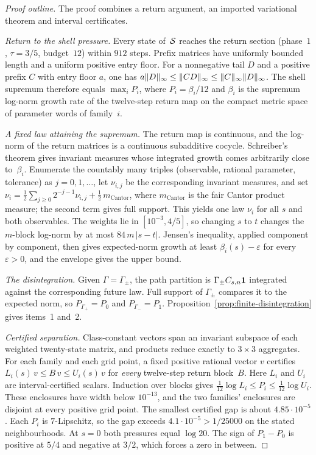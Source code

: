 \begin{proof}[Proof outline]
The proof combines a return argument, an imported variational theorem and interval certificates.

\emph{Return to the shell pressure.} Every state of~$\mathcal{S}$ reaches the return section (phase~$1$, $\tau=3/5$, budget~$12$) within $912$ steps. Prefix matrices have uniformly bounded length and a uniform positive entry floor. For a nonnegative tail $D$ and a positive prefix $C$ with entry floor $a$, one has $a\lVert D\rVert_{\infty}\le\lVert CD\rVert_{\infty}\le\lVert C\rVert_{\infty}\lVert D\rVert_{\infty}$. The shell supremum therefore equals $\max_i P_i$, where $P_i=\beta_i/12$ and $\beta_i$ is the supremum log-norm growth rate of the twelve-step return map on the compact metric space of parameter words of family~$i$.

\emph{A fixed law attaining the supremum.} The return map is continuous, and the log-norm of the return matrices is a continuous subadditive cocycle. Schreiber's theorem \cite[Theorem~1]{Schreiber1998Subadditive} gives invariant measures whose integrated growth comes arbitrarily close to~$\beta_i$. Enumerate the countably many triples (observable, rational parameter, tolerance) as $j=0,1,\dots$, let $\nu_{i,j}$ be the corresponding invariant measures, and set $\nu_i=\tfrac12\sum_{j\ge0}2^{-j-1}\nu_{i,j}+\tfrac12\,m_{\mathrm{Cantor}}$, where $m_{\mathrm{Cantor}}$ is the fair Cantor product measure; the second term gives full support. This yields one law $\nu_i$ for all $s$ and both observables. The weights lie in $[10^{-3},4/5]$, so changing $s$ to $t$ changes the $m$-block log-norm by at most $84\,m\,|s-t|$. Jensen's inequality, applied component by component, then gives expected-norm growth at least $\beta_i(s)-\varepsilon$ for every $\varepsilon>0$, and the envelope gives the upper bound.

\emph{The disintegration.} Given $\Gamma=\Gamma_\pm$, the path partition is $\Gamma_\pm C_{s,n}\mathbf{1}$ integrated against the corresponding future law. Full support of $\Gamma_\pm$ compares it to the expected norm, so $P_{\Gamma_+}=P_0$ and $P_{\Gamma_-}=P_1$. Proposition~\ref{prop:finite-disintegration} gives items~1 and~2.

\emph{Certified separation.} Class-constant vectors span an invariant subspace of each weighted twenty-state matrix, and products reduce exactly to $3\times3$ aggregates. For each family and each grid point, a fixed positive rational vector $v$ certifies $L_i(s)\,v\le B\,v\le U_i(s)\,v$ for \emph{every} twelve-step return block~$B$. Here $L_i$ and $U_i$ are interval-certified scalars. Induction over blocks gives $\frac1{12}\log L_i\le P_i\le\frac1{12}\log U_i$. These enclosures have width below $10^{-13}$, and the two families' enclosures are disjoint at every positive grid point. The smallest certified gap is about $4.85\cdot10^{-5}$. Each $P_i$ is $7$-Lipschitz, so the gap exceeds $4.1\cdot10^{-5}>1/25000$ on the stated neighbourhoods. At $s=0$ both pressures equal $\log20$. The sign of $P_1-P_0$ is positive at $5/4$ and negative at $3/2$, which forces a zero in between.
\end{proof}


